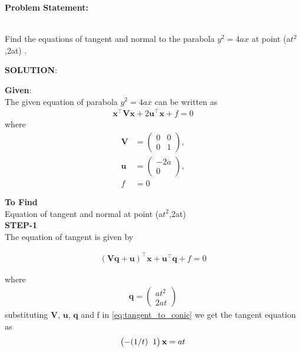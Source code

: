 \documentclass[10pt,a4paper]{report}
\newcommand{\myvec}[1]{\ensuremath{\begin{pmatrix}#1\end{pmatrix}}}
\let\vec\mathbf
\let\vec\mathbf
\begin{document}
\begin{multicols}{2}

\raggedright \textbf{Problem Statement:}\vspace{2mm}
\raggedright \\Find the equations of tangent and normal to the parabola  $y^2 = 4ax$ at point (a$t^2$,2at) .\\
\vspace{5mm}

\raggedright \textbf{SOLUTION}:\vspace{2mm}\\

\raggedright \textbf{Given}:\vspace{2mm}\\
The given equation of parabola $y^2 = 4ax$ can be written as
\begin{align}
    \label{eq:conic_quad_form}
    \vec{x}^{\top}\vec{V}\vec{x}+2\vec{u}^{\top}\vec{x}+f=0
    \end{align}
where
\begin{align}
	\label{eq:V_matrix}
	\vec{V} &= \myvec{0 & 0\\0 & 1},
	\\
	\label{eq:u_vector}
	\vec{u} &= \myvec{-2a\\0},
	\\
	\label{eq:f_value}
	f &= 0
\end{align}



\textbf{To Find }\vspace{2mm}\\
Equation of tangent and normal at  point (a$t^2$,2at) \vspace{5mm}  \\ 
\textbf{STEP-1}\vspace{2mm}\\
The equation of tangent is given by
\begin{center}
\begin{align}
\label{eq:tangent_to_conic}
 \vec{(Vq+u)}^{\top}\vec{x}+\vec{u}^{\top}\vec{q}+f =0 
\end{align}
\end{center}
where
\begin{align}
\vec{q}=\myvec{at^2\\
2at}
\end{align}
substituting $\vec{V}$, $\vec{u}$, $\vec{q}$ and f in \eqref{eq:tangent_to_conic} we get the tangent equation as\\
\begin{align}
\myvec{-(1/t) \hspace{2mm} 1} \vec{x}=at
\end{align}


\end{multicols}
\end{document}
